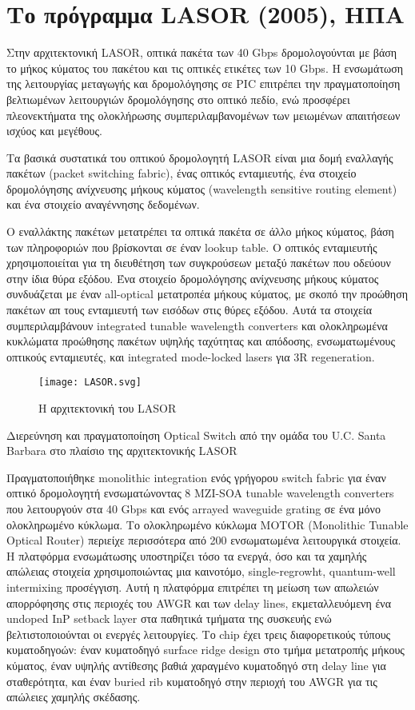 ﻿
\section{Το πρόγραμμα LASOR (2005), ΗΠΑ}

Στην αρχιτεκτονική LASOR, οπτικά πακέτα των 40 Gbps δρομολογούνται με
βάση το μήκος κύματος του πακέτου και τις οπτικές ετικέτες των 10
Gbps. Η ενσωμάτωση της λειτουργίας μεταγωγής και δρομολόγησης σε PIC
επιτρέπει την πραγματοποίηση βελτιωμένων λειτουργιών δρομολόγησης στο
οπτικό πεδίο, ενώ προσφέρει πλεονεκτήματα της ολοκλήρωσης
συμπεριλαμβανομένων των μειωμένων απαιτήσεων ισχύος και μεγέθους.

Τα βασικά συστατικά του οπτικού δρομολογητή LASΟR \cite{1584172} είναι
μια δομή εναλλαγής πακέτων (packet switching fabric), ένας οπτικός
ενταμιευτής, ένα στοιχείο δρομολόγησης ανίχνευσης μήκους κύματος
(wavelength sensitive routing element) και ένα στοιχείο αναγέννησης
δεδομένων.

Ο εναλλάκτης πακέτων μετατρέπει τα οπτικά πακέτα σε άλλο μήκος
κύματος, βάση των πληροφοριών που βρίσκονται σε έναν lookup table. Ο
οπτικός ενταμιευτής χρησιμοποιείται για τη διευθέτηση των συγκρούσεων
μεταξύ πακέτων που οδεύουν στην ίδια θύρα εξόδου. Ένα στοιχείο
δρομολόγησης ανίχνευσης μήκους κύματος συνδυάζεται με έναν all-optical
μετατροπέα μήκους κύματος, με σκοπό την προώθηση πακέτων απ τους
ενταμιευτή των εισόδων στις θύρες εξόδου. Αυτά τα στοιχεία
συμπεριλαμβάνουν integrated tunable wavelength converters και
ολοκληρωμένα κυκλώματα προώθησης πακέτων υψηλής ταχύτητας και
απόδοσης, ενσωματωμένους οπτικούς ενταμιευτές, και integrated 
mode-locked lasers για 3R regeneration.

\begin{figure}[h]
  \centering
  \texttt{[image: LASOR.svg]}
  \caption{Η αρχιτεκτονική του LASOR}
  \label{fig:lasor}
\end{figure}

Διερεύνηση και πραγματοποίηση Optical Switch από την ομάδα του U.C.
Santa Barbara στο πλαίσιο της αρχιτεκτονικής LASOR

Πραγματοποιήθηκε monolithic integration ενός γρήγορου switch fabric
για έναν οπτικό δρομολογητή ενσωματώνοντας 8 MZI-SOA tunable
wavelength converters που λειτουργούν στα 40 Gbps και ενός arrayed
waveguide grating σε ένα μόνο ολοκληρωμένο κύκλωμα. \cite{5515982} Το
ολοκληρωμένο κύκλωμα MOTOR (Monolithic Tunable Optical Router)
περιείχε περισσότερα από 200 ενσωματωμένα λειτουργικά στοιχεία. Η
πλατφόρμα ενσωμάτωσης υποστηρίζει τόσο τα ενεργά, όσο και τα χαμηλής
απώλειας στοιχεία χρησιμοποιώντας μια καινοτόμο, single-regrowht,
quantum-well intermixing προσέγγιση. Αυτή η πλατφόρμα επιτρέπει τη
μείωση των απωλειών απορρόφησης στις περιοχές του AWGR και των delay
lines, εκμεταλλευόμενη ένα undoped InP setback layer στα παθητικά
τμήματα της συσκευής ενώ βελτιστοποιούνται οι ενεργές λειτουργίες.  Το
chip έχει τρεις διαφορετικούς τύπους κυματοδηγοών: έναν κυματοδηγό
surface ridge design στο τμήμα μετατροπής μήκους κύματος, έναν υψηλής
αντίθεσης βαθιά χαραγμένο κυματοδηγό στη delay line για σταθερότητα,
και έναν buried rib κυματοδηγό στην περιοχή του AWGR για τις απώλειες
χαμηλής σκέδασης.

